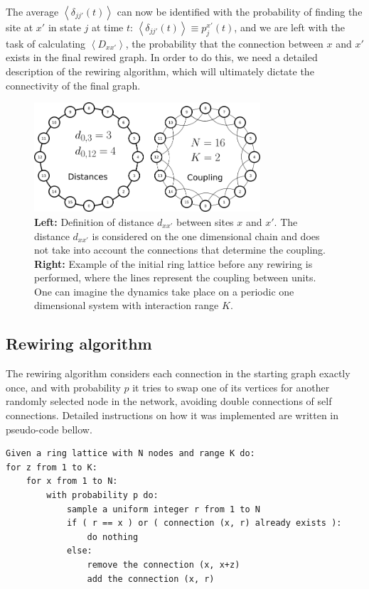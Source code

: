 The average $\left< \delta_{jj'}(t) \right>$ can now be identified with the probability of finding the site at $x'$ in state $j$ at
time $t$: $\left< \delta_{jj'}(t) \right> \equiv p^{x'}_j(t)$, and we are left with the task of calculating $\left< D_{xx'} \right>$,
the probability that the connection between $x$ and $x'$ exists in the final rewired graph.  In order to do this, we need a detailed
description of the rewiring algorithm, which will ultimately dictate the connectivity of the final graph. 

\begin{figure}
    \centering
    \includegraphics[width=0.75\textwidth]{fig/ring-distance.png}
    \caption{\label{fig:ring-distance}
        \textbf{Left:} Definition of distance $d_{xx'}$ between sites $x$ and $x'$. The distance $d_{xx'}$ is considered on the one
        dimensional chain and does not take into account the connections that determine the coupling.\\
        \textbf{Right:} Example of the initial ring lattice before any rewiring is performed, where the lines represent the coupling
        between units.\\
        One can imagine the dynamics take place on a periodic one dimensional system with interaction range $K$.
    }
\end{figure}

\subsection{Rewiring algorithm}

The rewiring algorithm considers each connection in the starting graph exactly once, and with probability $p$ it tries to swap one of
its vertices for another randomly selected node in the network, avoiding double connections of self connections. Detailed instructions
on how it was implemented are written in pseudo-code bellow.

\noindent
\begin{minipage}{\linewidth}
\begin{lstlisting}
Given a ring lattice with N nodes and range K do:
for z from 1 to K:
    for x from 1 to N:
        with probability p do:
            sample a uniform integer r from 1 to N
            if ( r == x ) or ( connection (x, r) already exists ):
                do nothing
            else:
                remove the connection (x, x+z)
                add the connection (x, r)
\end{lstlisting}
\end{minipage}


